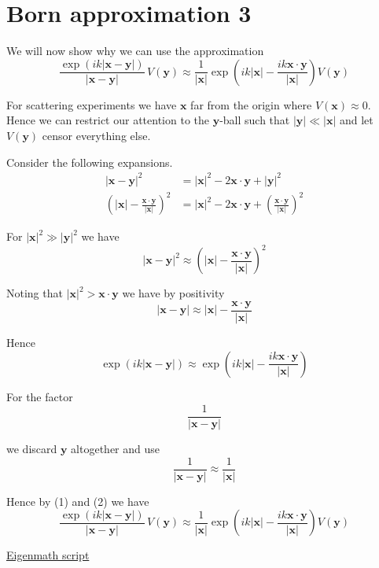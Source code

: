 

\section*{Born approximation 3}

We will now show why we can use the approximation
\begin{equation*}
\frac{\exp(ik|\mathbf x-\mathbf y|)}{|\mathbf x-\mathbf y|}\,V(\mathbf y)
\approx\frac{1}{|\mathbf x|}
\exp\left(ik|\mathbf x|-\frac{ik\mathbf x\cdot\mathbf y}{|\mathbf x|}\right)V(\mathbf y)
\end{equation*}

For scattering experiments we have $\mathbf x$ far from the origin where $V(\mathbf x)\approx0$.
Hence we can restrict our attention to the $\mathbf y$-ball such that
$|\mathbf y|\ll|\mathbf x|$ and let $V(\mathbf y)$ censor everything else.

\bigskip
Consider the following expansions.
\begin{align*}
|\mathbf x-\mathbf y|^2
&=|\mathbf x|^2-2\mathbf x\cdot\mathbf y+|\mathbf y|^2
\\[1ex]
\left(|\mathbf x|-\frac{\mathbf x\cdot\mathbf y}{|\mathbf x|}\right)^2
&=|\mathbf x|^2-2\mathbf x\cdot\mathbf y
+\left(\frac{\mathbf x\cdot\mathbf y}{|\mathbf x|}\right)^2
\end{align*}

For $|\mathbf x|^2\gg|\mathbf y|^2$ we have
\begin{equation*}
|\mathbf x-\mathbf y|^2
\approx
\left(|\mathbf x|-\frac{\mathbf x\cdot\mathbf y}{|\mathbf x|}\right)^2
\end{equation*}

Noting that $|\mathbf x|^2>\mathbf x\cdot\mathbf y$ we have by positivity
\begin{equation*}
|\mathbf x-\mathbf y|\approx|\mathbf x|-\frac{\mathbf x\cdot\mathbf y}{|\mathbf x|}
\end{equation*}

Hence
\begin{equation*}
\exp(ik|\mathbf x-\mathbf y|)
\approx
\exp\left(ik|\mathbf x|-\frac{ik\mathbf x\cdot\mathbf y}{|\mathbf x|}\right)
\tag{1}
\end{equation*}

For the factor
\begin{equation*}
\frac{1}{|\mathbf x-\mathbf y|}
\end{equation*}

we discard $\mathbf y$ altogether and use
\begin{equation*}
\frac{1}{|\mathbf x-\mathbf y|}\approx\frac{1}{|\mathbf x|}
\tag{2}
\end{equation*}

Hence by (1) and (2) we have
\begin{equation*}
\frac{\exp(ik|\mathbf x-\mathbf y|)}{|\mathbf x-\mathbf y|}\,V(\mathbf y)
\approx\frac{1}{|\mathbf x|}
\exp\left(ik|\mathbf x|-\frac{ik\mathbf x\cdot\mathbf y}{|\mathbf x|}\right)V(\mathbf y)
\end{equation*}

\href{https://georgeweigt.github.io/examples/born-approximation-3-demo.html}{Eigenmath script}


